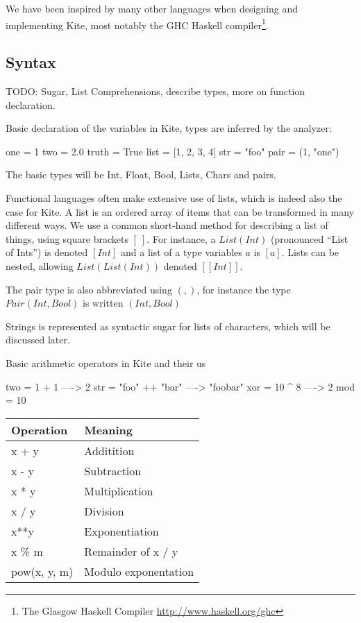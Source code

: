 We have been inspired by many other languages when designing and
implementing Kite, most notably the GHC Haskell compiler\footnote{The
  Glasgow Haskell Compiler \url{http://www.haskell.org/ghc}}.

\subsection{Syntax}

TODO: Sugar, List Comprehensions, describe types, more on function declaration.

Basic declaration of the variables in Kite, types are inferred by the analyzer:
\begin{kite}
  
  one = 1
  two = 2.0
  truth = True
  list = [1, 2, 3, 4]
  str = "foo" 
  pair = (1, "one")
\end{kite}

The basic types will be Int, Float, Bool, Lists, Chars and
pairs.

Functional languages often make extensive use of lists, which is
indeed also the case for Kite. A list is an ordered array of items
that can be transformed in many different ways. We use a common
short-hand method for describing a list of things, using square
brackets $[\ ]$. For instance, a $List(Int)$ (pronounced ``List of
Ints'') is denoted $[Int]$ and a list of a type variables $a$ is
$[a]$. Lists can be nested, allowing $List(List(Int))$ denoted
$[[Int]]$.

The pair type is also abbreviated using $(,)$, for instance the type
$Pair(Int, Bool)$ is written $(Int, Bool)$

Strings is represented as syntactic sugar for lists of characters,
which will be discussed later.

Basic arithmetic operators in Kite and their us
\begin{kite}

  two = 1 + 1  ---->  2
  str = "foo" ++ "bar" ----> "foobar"
  xor = 10 ^ 8 ----> 2
  mod = 10 %
\end{kite}

\begin{table}[H]
\centering
    \begin{tabular}{|l|l|}
    \hline
    Operation    & Meaning              \\ \hline
    x + y        & Additition           \\ \hline
    x - y        & Subtraction          \\ \hline
    x * y        & Multiplication       \\ \hline
    x / y        & Division             \\ \hline
    x**y         & Exponentiation       \\ \hline
    x \% m       & Remainder of x / y   \\ \hline
    pow(x, y, m) & Modulo exponentation \\ \hline
    \end{tabular}
\end{table}

